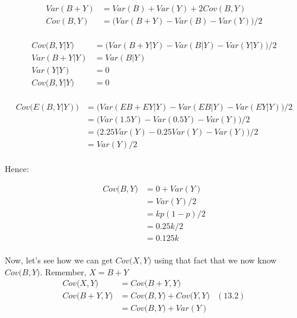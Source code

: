 \documentclass[12pt]{article}
\begin{document}
\begin{equation*}
	\begin{aligned}
	Var(B + Y) &= Var(B) + Var(Y) + 2Cov(B,Y) \\
	Cov(B,Y) &= \big(Var(B + Y) - Var(B) - Var(Y)\big)/2 \\
	\end{aligned}
\end{equation*}

\begin{equation*}
	\begin{aligned}
	Cov\big(B,Y|Y\big) &= \big(Var(B + Y|Y) - Var(B|Y) - Var(Y|Y)\big)/2 \\
	Var(B + Y|Y) &= Var(B|Y)\\
	Var(Y|Y)&=0 \\
	Cov\big(B,Y|Y\big) &= 0 \\
	\end{aligned}
\end{equation*}

\begin{equation*}
	\begin{aligned}
	Cov\big(E(B,Y|Y)\big) &= \big(Var(EB + EY|Y) - Var(EB|Y) - Var(EY|Y)\big)/2 \\
	        &= \big(Var(1.5Y) - Var(0.5Y) - Var(Y)\big)/2 \\
	        &= \big(2.25Var(Y) - 0.25Var(Y) - Var(Y)\big)/2 \\
	        &= Var(Y)/2 \\
	\end{aligned}
\end{equation*}

Hence:

\begin{equation*}
	\begin{aligned}
	Cov\big(B,Y\big) &= 0 + Var(Y)\\
	&= Var(Y)/2\\
	&= kp(1-p)/2\\
	&= 0.25k/2\\
	&= 0.125k\\
	\end{aligned}
\end{equation*}

Now, let's see how we can get $Cov\big(X,Y\big)$ using that fact that we now know $Cov\big(B,Y\big)$. Remember, $X=B+Y$
\begin{equation*}
	\begin{aligned}
	Cov\big(X,Y\big) &= Cov\big(B+Y,Y\big)\\
	Cov\big(B+Y,Y\big) &= Cov\big(B,Y\big) + Cov\big(Y,Y\big)&(\textrm{13.2})\\
	&= Cov\big(B,Y\big) + Var(Y)\\
	\end{aligned}
\end{equation*}
\end{document}
